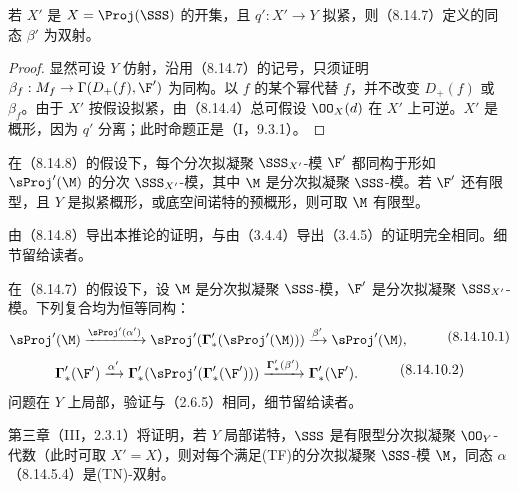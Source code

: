  若 $X'$ 是 $X=\Proj(\SSS)$ 的开集，且 $q':X'\to Y$ 拟紧，则（8.14.7）定义的同态 $\beta'$ 为双射。
\begin{proof}
显然可设 $Y$ 仿射，沿用（8.14.7）的记号，只须证明 $\beta_f:M_f\to\Gamma(D_+(f),\F')$ 为同构。以 $f$ 的某个幂代替 $f$，并不改变 $D_+(f)$ 或 $\beta_f$。由于 $X'$ 按假设拟紧，由（8.14.4）总可假设 $\OO_X(d)$ 在 $X'$ 上可逆。$X'$ 是概形，因为 $q'$ 分离；此时命题正是（I，9.3.1）。
\end{proof}

 在（8.14.8）的假设下，每个分次拟凝聚 $\SSS_{X'}$-模 $\F'$ 都同构于形如 $\sProj'(\M)$ 的分次 $\SSS_{X'}$-模，其中 $\M$ 是分次拟凝聚 $\SSS$-模。若 $\F'$ 还有限型，且 $Y$ 是拟紧概形，或底空间诺特的预概形，则可取 $\M$ 有限型。

由（8.14.8）导出本推论的证明，与由（3.4.4）导出（3.4.5）的证明完全相同。细节留给读者。

 在（8.14.7）的假设下，设 $\M$ 是分次拟凝聚 $\SSS$-模，$\F'$ 是分次拟凝聚 $\SSS_{X'}$-模。下列复合均为恒等同构：
\begin{equation}\begin{aligned}
\sProj'(\M)&\xrightarrow{\sProj'(\alpha')}
\sProj'(\boldsymbol\Gamma'_*(\sProj'(\M)))
\xrightarrow{\beta'}\sProj'(\M),
\end{aligned}\tag{8.14.10.1}\end{equation}
\begin{equation}\begin{aligned}
\boldsymbol\Gamma'_*(\F')&\xrightarrow{\alpha'}
\boldsymbol\Gamma'_*(\sProj'(\boldsymbol\Gamma'_*(\F')))
\xrightarrow{\boldsymbol\Gamma'_*(\beta')}\boldsymbol\Gamma'_*(\F').
\end{aligned}\tag{8.14.10.2}\end{equation}
问题在 $Y$ 上局部，验证与（2.6.5）相同，细节留给读者。

 第三章（III，2.3.1）将证明，若 $Y$ 局部诺特，$\SSS$ 是有限型分次拟凝聚 $\OO_Y$-代数（此时可取 $X'=X$），则对每个满足(TF)的分次拟凝聚 $\SSS$-模 $\M$，同态 $\alpha$（8.14.5.4）是(TN)-双射。

